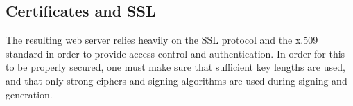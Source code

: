 \subsection {Certificates and SSL}

The resulting web server relies heavily on the SSL protocol and the x.509 standard in order to provide access control and authentication. In order for this to be properly secured, one must make sure that sufficient key lengths are used, and that only strong ciphers and signing algorithms are used during signing and generation. \cite{cipher} 




